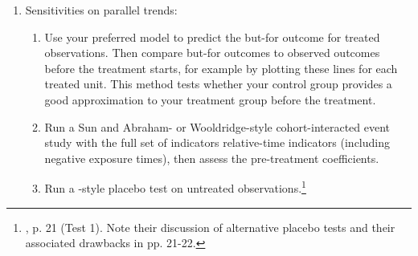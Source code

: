 \documentclass[12pt]{article}
\begin{document}
\begin{enumerate}
\begin{enumerate}
        \item Run a Sun and Abraham-style auxiliary regression (Their equation 13 following Proposition 1) to estimate TWFE treatment weights. Can also use the method from \citet{borusyak2024revisiting} Proof of Proposition 2. Assess relationships between these weights and observables such as time. This is especially useful when binning the data, as demonstrated in \citet{borusyak2024revisiting} Section 5.2.1.
         \begin{enumerate}
            \item If using a TWFE-style model, examine the weights over many subsets of the data. For example, see if certain subsets get systematically negative weight, and understand how that might bias your results. For examples of visualizations of negative weights, see \citet{jakiela2021a}, Figures 2 through 4.
        \end{enumerate}
        \item Consider whether the treatment effect may vary by other observables, and measure them separately if needed. For example, are certain products likely to see higher price increases from a conspiracy? Or, in a class action context, it could be that some groups of customers were not affected by the alleged conduct. While measuring many separate treatment effects can be useful, doing so to intentionally lower the precision of someone’s model is bad practice. Further, using iterated regressions to find a subset of units with no treatment effect is subject to model selection bias.
    \end{enumerate}
    \item Sensitivities on parallel trends:
    \begin{enumerate}
        \item \label{butfor-item} Use your preferred model to predict the but-for outcome for treated observations. Then compare but-for outcomes to observed outcomes before the treatment starts, for example by plotting these lines for each treated unit. This method tests whether your control group provides a good approximation to your treatment group before the treatment.
        \item Run a Sun and Abraham- or Wooldridge-style cohort-interacted event study with the full set of indicators relative-time indicators (including negative exposure times), then assess the pre-treatment coefficients.
        \item Run a \citet{borusyak2024revisiting}-style placebo test on untreated observations.\footnote{\citet{borusyak2024revisiting}, p. 21 (Test 1). Note their discussion of alternative placebo tests and their associated drawbacks in pp. 21-22.
}
\end{enumerate}
\end{enumerate}
\end{document}
